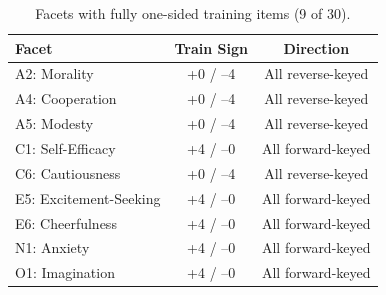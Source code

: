 \documentclass[11pt]{article}
\begin{document}
\begin{table}[h]
\centering
\caption{Facets with fully one-sided training items (9 of 30).}
\begin{tabular}{lcc}
\toprule
Facet & Train Sign & Direction \\
\midrule
A2: Morality         & +0 / --4 & All reverse-keyed \\
A4: Cooperation      & +0 / --4 & All reverse-keyed \\
A5: Modesty          & +0 / --4 & All reverse-keyed \\
C1: Self-Efficacy    & +4 / --0 & All forward-keyed \\
C6: Cautiousness     & +0 / --4 & All reverse-keyed \\
E5: Excitement-Seeking & +4 / --0 & All forward-keyed \\
E6: Cheerfulness     & +4 / --0 & All forward-keyed \\
N1: Anxiety          & +4 / --0 & All forward-keyed \\
O1: Imagination      & +4 / --0 & All forward-keyed \\
\bottomrule
\end{tabular}
\end{table}
\end{document}
